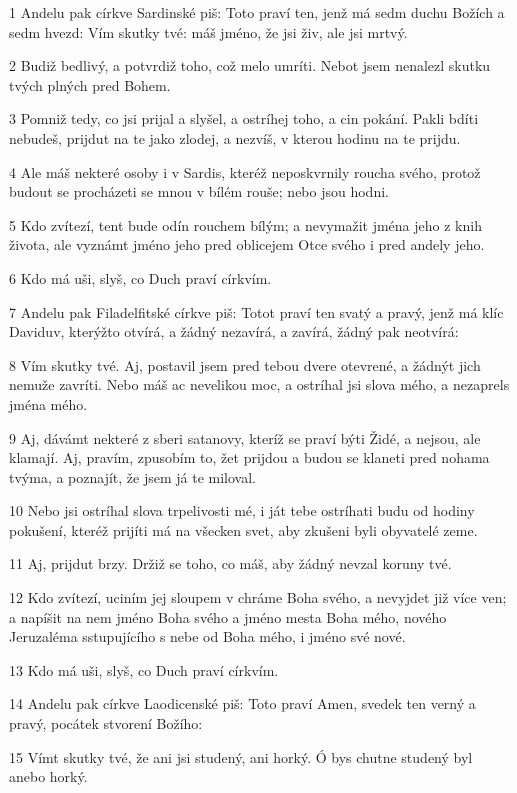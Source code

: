 \par 1 Andelu pak církve Sardinské piš: Toto praví ten, jenž má sedm duchu Božích a sedm hvezd: Vím skutky tvé: máš jméno, že jsi živ, ale jsi mrtvý.
\par 2 Budiž bedlivý, a potvrdiž toho, což melo umríti. Nebot jsem nenalezl skutku tvých plných pred Bohem.
\par 3 Pomniž tedy, co jsi prijal a slyšel, a ostríhej toho, a cin pokání. Pakli bdíti nebudeš, prijdut na te jako zlodej, a nezvíš, v kterou hodinu na te prijdu.
\par 4 Ale máš nekteré osoby i v Sardis, kteréž neposkvrnily roucha svého, protož budout se procházeti se mnou v bílém rouše; nebo jsou hodni.
\par 5 Kdo zvítezí, tent bude odín rouchem bílým; a nevymažit jména jeho z knih života, ale vyznámt jméno jeho pred oblicejem Otce svého i pred andely jeho.
\par 6 Kdo má uši, slyš, co Duch praví církvím.
\par 7 Andelu pak Filadelfitské církve piš: Totot praví ten svatý a pravý, jenž má klíc Daviduv, kterýžto otvírá, a žádný nezavírá, a zavírá, žádný pak neotvírá:
\par 8 Vím skutky tvé. Aj, postavil jsem pred tebou dvere otevrené, a žádnýt jich nemuže zavríti. Nebo máš ac nevelikou moc, a ostríhal jsi slova mého, a nezaprels jména mého.
\par 9 Aj, dávámt nekteré z sberi satanovy, kteríž se praví býti Židé, a nejsou, ale klamají. Aj, pravím, zpusobím to, žet prijdou a budou se klaneti pred nohama tvýma, a poznajít, že jsem já te miloval.
\par 10 Nebo jsi ostríhal slova trpelivosti mé, i ját tebe ostríhati budu od hodiny pokušení, kteréž prijíti má na všecken svet, aby zkušeni byli obyvatelé zeme.
\par 11 Aj, prijdut brzy. Držiž se toho, co máš, aby žádný nevzal koruny tvé.
\par 12 Kdo zvítezí, uciním jej sloupem v chráme Boha svého, a nevyjdet již více ven; a napíšit na nem jméno Boha svého a jméno mesta Boha mého, nového Jeruzaléma sstupujícího s nebe od Boha mého, i jméno své nové.
\par 13 Kdo má uši, slyš, co Duch praví církvím.
\par 14 Andelu pak církve Laodicenské piš: Toto praví Amen, svedek ten verný a pravý, pocátek stvorení Božího:
\par 15 Vímt skutky tvé, že ani jsi studený, ani horký. Ó bys chutne studený byl anebo horký.
